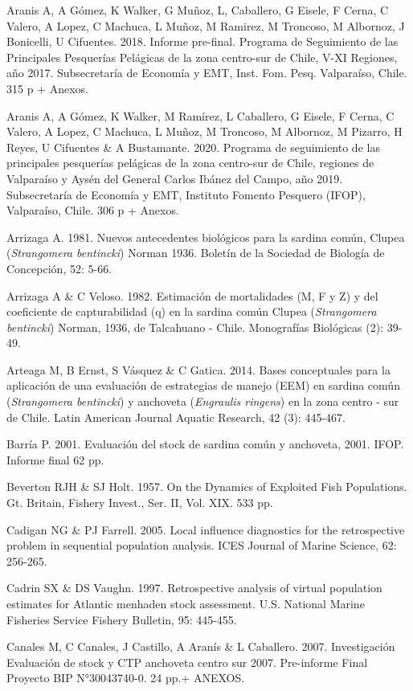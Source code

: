 \documentclass[
  spanish,
]{article}
\begin{document}
Aranis A, A Gómez, K Walker, G Muñoz, L, Caballero, G Eisele, F Cerna, C
Valero, A Lopez, C Machuca, L Muñoz, M Ramirez, M Troncoso, M Albornoz,
J Bonicelli, U Cifuentes. 2018. Informe pre-final. Programa de
Seguimiento de las Principales Pesquerías Pelágicas de la zona
centro-sur de Chile, V-XI Regiones, año 2017. Subsecretaría de Economía
y EMT, Inst. Fom. Pesq. Valparaíso, Chile. 315 p + Anexos.

Aranis A, A Gómez, K Walker, M Ramírez, L Caballero, G Eisele, F Cerna,
C Valero, A Lopez, C Machuca, L Muñoz, M Troncoso, M Albornoz, M
Pizarro, H Reyes, U Cifuentes \& A Bustamante. 2020. Programa de
seguimiento de las principales pesquerías pelágicas de la zona
centro-sur de Chile, regiones de Valparaíso y Aysén del General Carlos
Ibánez del Campo, año 2019. Subsecretaría de Economía y EMT, Instituto
Fomento Pesquero (IFOP), Valparaíso, Chile. 306 p + Anexos.

Arrizaga A. 1981. Nuevos antecedentes biológicos para la sardina común,
Clupea (\emph{Strangomera bentincki}) Norman 1936. Boletín de la
Sociedad de Biología de Concepción, 52: 5-66.

Arrizaga A \& C Veloso. 1982. Estimación de mortalidades (M, F y Z) y
del coeficiente de capturabilidad (q) en la sardina común Clupea
(\emph{Strangomera bentincki}) Norman, 1936, de Talcahuano - Chile.
Monografías Biológicas (2): 39-49.

Arteaga M, B Ernst, S Vásquez \& C Gatica. 2014. Bases conceptuales para
la aplicación de una evaluación de estrategias de manejo (EEM) en
sardina común (\emph{Strangomera bentincki}) y anchoveta
(\emph{Engraulis ringens}) en la zona centro - sur de Chile. Latin
American Journal Aquatic Research, 42 (3): 445-467.

Barría P. 2001. Evaluación del stock de sardina común y anchoveta, 2001.
IFOP. Informe final 62 pp.

Beverton RJH \& SJ Holt. 1957. On the Dynamics of Exploited Fish
Populations. Gt. Britain, Fishery Invest., Ser. II, Vol. XIX. 533 pp.

Cadigan NG \& PJ Farrell. 2005. Local influence diagnostics for the
retrospective problem in sequential population analysis. ICES Journal of
Marine Science, 62: 256-265.

Cadrin SX \& DS Vaughn. 1997. Retrospective analysis of virtual
population estimates for Atlantic menhaden stock assessment. U.S.
National Marine Fisheries Service Fishery Bulletin, 95: 445-455.

Canales M, C Canales, J Castillo, A Aranís \& L Caballero. 2007.
Investigación Evaluación de stock y CTP anchoveta centro sur 2007.
Pre-informe Final Proyecto BIP N°30043740-0. 24 pp.+ ANEXOS.
\end{document}
